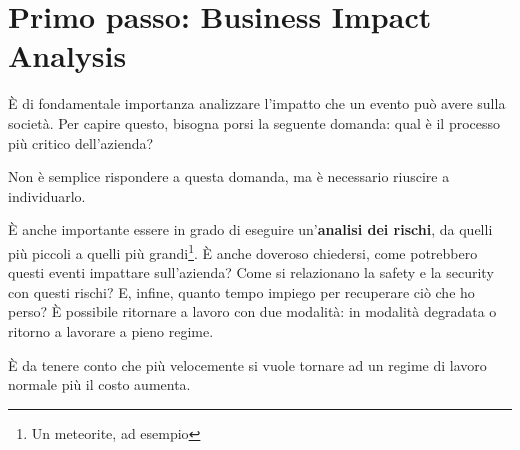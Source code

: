 \section{Primo passo: Business Impact Analysis}

È di fondamentale importanza analizzare l'impatto che un evento può avere sulla
società. Per capire questo, bisogna porsi la seguente domanda: qual è il
processo più critico dell'azienda?

Non è semplice rispondere a questa domanda, ma è necessario riuscire a
individuarlo.

È anche importante essere in grado di eseguire un'\textbf{analisi dei rischi},
da quelli più piccoli a quelli più grandi\footnote{Un meteorite, ad esempio}. È
anche doveroso chiedersi, come potrebbero questi eventi impattare sull'azienda?
Come si relazionano la safety e la security con questi rischi? E, infine,
quanto tempo impiego per recuperare ciò che ho perso? È possibile ritornare a
lavoro con due modalità: in modalità degradata o ritorno a lavorare a pieno 
regime.

È da tenere conto che più velocemente si vuole tornare ad un regime di lavoro
normale più il costo aumenta.
